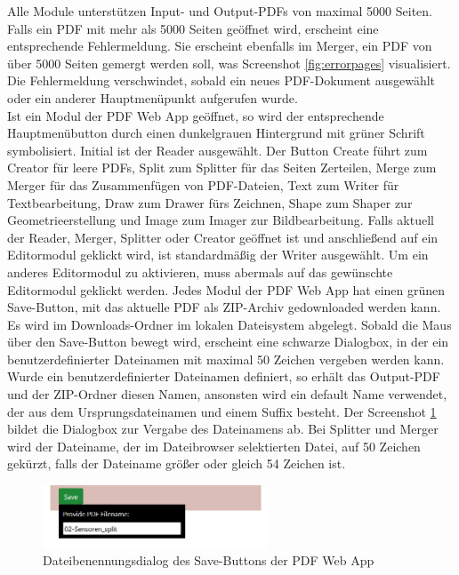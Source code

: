 Alle Module unterstützen Input- und Output-PDFs von maximal 5000 Seiten. Falls ein PDF mit mehr als 5000 Seiten geöffnet wird, erscheint eine entsprechende Fehlermeldung. Sie erscheint ebenfalls im Merger, ein PDF von über 5000 Seiten gemergt werden soll, was Screenshot \ref{fig:errorpages} visualisiert. Die Fehlermeldung verschwindet, sobald ein neues PDF-Dokument ausgewählt oder ein anderer Hauptmenüpunkt aufgerufen wurde. \\
Ist ein Modul der PDF Web App geöffnet, so wird der entsprechende Hauptmenübutton durch einen dunkelgrauen Hintergrund mit grüner Schrift symbolisiert. Initial ist der Reader ausgewählt. Der Button Create führt zum Creator für leere PDFs, Split zum Splitter für das Seiten Zerteilen, Merge zum Merger für das Zusammenfügen von PDF-Dateien, Text zum Writer für Textbearbeitung, Draw zum Drawer fürs Zeichnen, Shape zum Shaper zur Geometrieerstellung und Image zum Imager zur Bildbearbeitung. Falls aktuell der Reader, Merger, Splitter oder Creator geöffnet ist und anschließend auf ein Editormodul geklickt wird, ist standardmäßig der Writer ausgewählt. Um ein anderes Editormodul zu aktivieren, muss abermals auf das gewünschte Editormodul geklickt werden. Jedes Modul der PDF Web App hat einen grünen Save-Button, mit das aktuelle PDF als ZIP-Archiv gedownloaded werden kann. Es wird im Downloads-Ordner im lokalen Dateisystem abgelegt. Sobald die Maus über den Save-Button bewegt wird, erscheint eine schwarze Dialogbox, in der ein benutzerdefinierter Dateinamen mit maximal 50 Zeichen vergeben werden kann. Wurde ein benutzerdefinierter Dateinamen definiert, so erhält das Output-PDF und der ZIP-Ordner diesen Namen, ansonsten wird ein default Name verwendet, der aus dem Ursprungsdateinamen und einem Suffix besteht. Der Screenshot \ref{fig:save} bildet die Dialogbox zur Vergabe des Dateinamens ab. Bei Splitter und Merger wird der Dateiname, der im Dateibrowser selektierten Datei, auf 50 Zeichen gekürzt, falls der Dateiname größer oder gleich 54 Zeichen ist.

\begin{figure}[!htbp]
	\centering
	\includegraphics[width=0.6\textwidth]{"images/save.png"}
	\caption{Dateibenennungsdialog des Save-Buttons der PDF Web App}
	\label{fig:save}
\end{figure}

